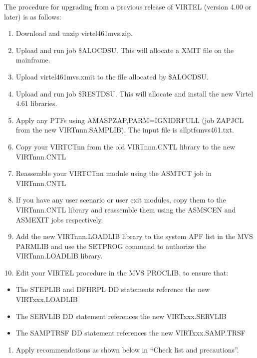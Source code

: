 \documentclass[letterpaper,10pt,english]{sphinxmanual}
\begin{document}
\sphinxAtStartPar
The procedure for upgrading from a previous release of VIRTEL (version 4.00 or later) is as follows:
\begin{enumerate}
%
\item {} 
\sphinxAtStartPar
Download and unzip virtel461mvs.zip.

\item {} 
\sphinxAtStartPar
Upload and run job \$ALOCDSU. This will allocate a XMIT file on the mainframe.

\item {} 
\sphinxAtStartPar
Upload virtel461mvs.xmit to the file allocated by \$ALOCDSU.

\item {} 
\sphinxAtStartPar
Upload and run job \$RESTDSU. This will allocate and install the new Virtel 4.61 libraries.

\item {} 
\sphinxAtStartPar
Apply any PTFs using AMASPZAP,PARM=IGNIDRFULL (job ZAPJCL from the new VIRTnnn.SAMPLIB). The input file is allptfs\sphinxhyphen{}mvs461.txt.

\item {} 
\sphinxAtStartPar
Copy your VIRTCTnn from the old VIRTnnn.CNTL library to the new VIRTnnn.CNTL

\item {} 
\sphinxAtStartPar
Reassemble your VIRTCTnn module using the ASMTCT job in VIRTnnn.CNTL

\item {} 
\sphinxAtStartPar
If you have any user scenario or user exit modules, copy them to the VIRTnnn.CNTL library and reassemble them using the ASMSCEN and ASMEXIT jobs respectively.

\item {} 
\sphinxAtStartPar
Add the new VIRTnnn.LOADLIB library to the system APF list in the MVS PARMLIB and use the SETPROG command to authorize the VIRTnnn.LOADLIB library.

\item {} 
\sphinxAtStartPar
Edit your VIRTEL procedure in the MVS PROCLIB, to ensure that:

\end{enumerate}
\begin{itemize}
\item {} 
\sphinxAtStartPar
The STEPLIB and DFHRPL DD statements reference the new VIRTxxx.LOADLIB

\item {} 
\sphinxAtStartPar
The SERVLIB DD statement references the new VIRTxxx.SERVLIB

\item {} 
\sphinxAtStartPar
The SAMPTRSF DD statement references the new VIRTxxx.SAMP.TRSF

\end{itemize}
\begin{enumerate}
%
\setcounter{enumi}{10}
\item {} 
\sphinxAtStartPar
Apply recommendations as shown below in “Check list and precautions”.

\end{enumerate}
\end{document}
